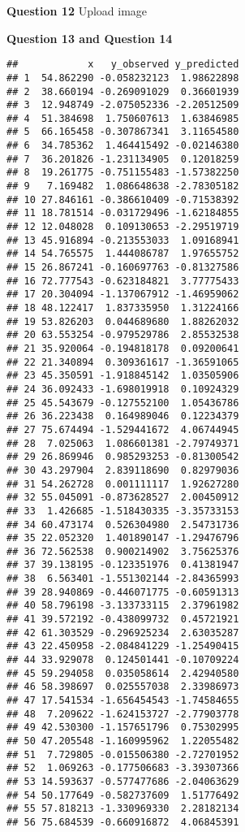 \documentclass[
]{article}
\newenvironment{Shaded}{\begin{snugshade}}{\end{snugshade}}
\newcommand{\FunctionTok}[1]{\textcolor[rgb]{0.00,0.00,0.00}{#1}}
\newcommand{\NormalTok}[1]{#1}
\newcommand{\OtherTok}[1]{\textcolor[rgb]{0.56,0.35,0.01}{#1}}
\newcommand{\SpecialCharTok}[1]{\textcolor[rgb]{0.00,0.00,0.00}{#1}}
\begin{document}
\textbf{Question 12} Upload image

\textbf{Question 13 and Question 14}

\begin{Shaded}
\end{Shaded}

\begin{verbatim}
##            x   y_observed y_predicted
## 1  54.862290 -0.058232123  1.98622898
## 2  38.660194 -0.269091029  0.36601939
## 3  12.948749 -2.075052336 -2.20512509
## 4  51.384698  1.750607613  1.63846985
## 5  66.165458 -0.307867341  3.11654580
## 6  34.785362  1.464415492 -0.02146380
## 7  36.201826 -1.231134905  0.12018259
## 8  19.261775 -0.751155483 -1.57382250
## 9   7.169482  1.086648638 -2.78305182
## 10 27.846161 -0.386610409 -0.71538392
## 11 18.781514 -0.031729496 -1.62184855
## 12 12.048028  0.109130653 -2.29519719
## 13 45.916894 -0.213553033  1.09168941
## 14 54.765575  1.444086787  1.97655752
## 15 26.867241 -0.160697763 -0.81327586
## 16 72.777543 -0.623184821  3.77775433
## 17 20.304094 -1.137067912 -1.46959062
## 18 48.122417  1.837335950  1.31224166
## 19 53.826203  0.044689680  1.88262032
## 20 63.553254 -0.979529786  2.85532538
## 21 35.920064 -0.194818178  0.09200641
## 22 21.340894  0.309361617 -1.36591065
## 23 45.350591 -1.918845142  1.03505906
## 24 36.092433 -1.698019918  0.10924329
## 25 45.543679 -0.127552100  1.05436786
## 26 36.223438  0.164989046  0.12234379
## 27 75.674494 -1.529441672  4.06744945
## 28  7.025063  1.086601381 -2.79749371
## 29 26.869946  0.985293253 -0.81300542
## 30 43.297904  2.839118690  0.82979036
## 31 54.262728  0.001111117  1.92627280
## 32 55.045091 -0.873628527  2.00450912
## 33  1.426685 -1.518430335 -3.35733153
## 34 60.473174  0.526304980  2.54731736
## 35 22.052320  1.401890147 -1.29476796
## 36 72.562538  0.900214902  3.75625376
## 37 39.138195 -0.123351976  0.41381947
## 38  6.563401 -1.551302144 -2.84365993
## 39 28.940869 -0.446071775 -0.60591313
## 40 58.796198 -3.133733115  2.37961982
## 41 39.572192 -0.438099732  0.45721921
## 42 61.303529 -0.296925234  2.63035287
## 43 22.450958 -2.084841229 -1.25490415
## 44 33.929078  0.124501441 -0.10709224
## 45 59.294058  0.035058614  2.42940580
## 46 58.398697  0.025557038  2.33986973
## 47 17.541534 -1.656454543 -1.74584655
## 48  7.209622 -1.624153727 -2.77903778
## 49 42.530300 -1.157651796  0.75302995
## 50 47.205548 -1.160995962  1.22055482
## 51  7.729805 -0.015506380 -2.72701952
## 52  1.069263 -0.177506683 -3.39307366
## 53 14.593637 -0.577477686 -2.04063629
## 54 50.177649 -0.582737609  1.51776492
## 55 57.818213 -1.330969330  2.28182134
## 56 75.684539 -0.660916872  4.06845391
\end{verbatim}
\end{document}

